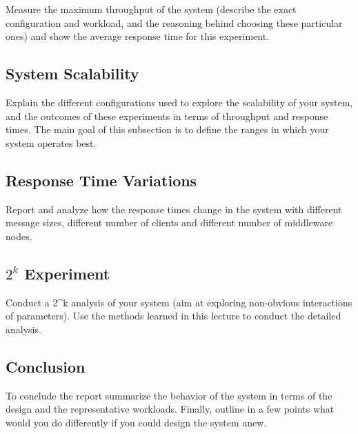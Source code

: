 Measure the maximum throughput of the system (describe the exact
configuration and workload, and the reasoning behind choosing these
particular ones) and show the average response time for this experiment.

\subsection{System Scalability}\label{sec:system-scalability}

Explain the different configurations used to explore the scalability of
your system, and the outcomes of these experiments in terms of
throughput and response times. The main goal of this subsection is to
define the ranges in which your system operates best.

\subsection{Response Time Variations}\label{sec:response-time-variations}

Report and analyze how the response times change in the system with
different message sizes, different number of clients and different
number of middleware nodes.

\subsection{$2^k$ Experiment}\label{sec:k-experiment}

Conduct a 2\^{}k analysis of your system (aim at exploring non-obvious
interactions of parameters). Use the methods learned in this lecture to
conduct the detailed analysis.

\subsection{Conclusion}\label{sec:conclusion}

To conclude the report summarize the behavior of the system in terms of
the design and the representative workloads. Finally, outline in a few
points what would you do differently if you could design the system
anew.